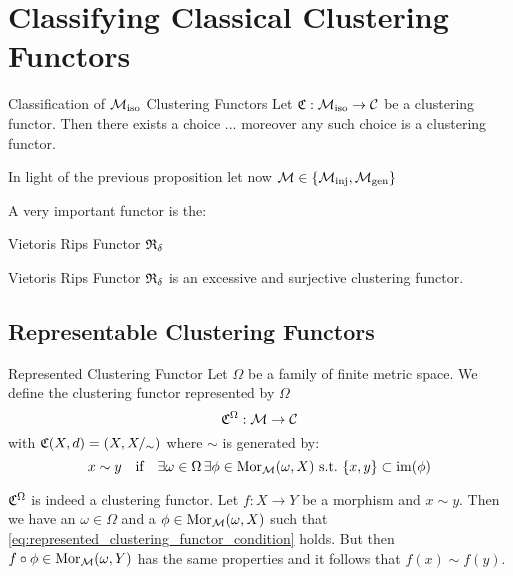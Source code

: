\chapter{Classifying Classical Clustering Functors}

\begin{proposition}{Classification of ${\mathcal{M}_\mathrm{iso}}$ Clustering Functors}{}
Let $\mathfrak{C}: {\mathcal{M}_\mathrm{iso}} \to \mathcal{C}$ be a clustering functor. Then there exists a choice ... moreover any such choice is a clustering functor.
\end{proposition}
In light of the previous proposition let now $\mathcal{M} \in \{{\mathcal{M}_\mathrm{inj}}, {\mathcal{M}_\mathrm{gen}}\}$


A very important functor is the:
\begin{definition}{Vietoris Rips Functor}{}
$\mathfrak{R}_\delta$
\end{definition}




\begin{proposition}{Vietoris Rips Functor}{}
$\mathfrak{R}_\delta$ is an excessive and surjective clustering functor.
\end{proposition}

\section{Representable Clustering Functors}

\begin{definition}{Represented Clustering Functor}{}
Let $\Omega$ be a family of finite metric space. We define the clustering functor represented by $\Omega$
$$
\mathfrak{C}^\Omega: \mathcal{M} \to \mathcal{C}
$$
with $\mathfrak{C}(X,d) = (X, X/_\sim)$ where $\sim$ is generated by:
\begin{equation}
\label{eq:represented_clustering_functor_condition}
x \sim y \quad \text{if} \quad \exists \omega \in \Omega \,\exists \phi \in \mathrm {Mor}_{\mathcal{M}}(\omega, X) \ \text{s.t.} \ \{x,y\} \subset \operatorname*{im}(\phi)
\end{equation}
\end{definition}

$\mathfrak{C}^\Omega$ is indeed a clustering functor. Let $f: X \to Y$ be a morphism and $x \sim y$. Then we have an $\omega \in \Omega$ and a $\phi \in \mathrm {Mor}_{\mathcal{M}}(\omega, X)$ such that \ref{eq:represented_clustering_functor_condition} holds. But then $f \circ \phi \in \mathrm {Mor}_{\mathcal{M}}(\omega,Y)$ has the same properties and it follows that $f(x) \sim f(y)$.

